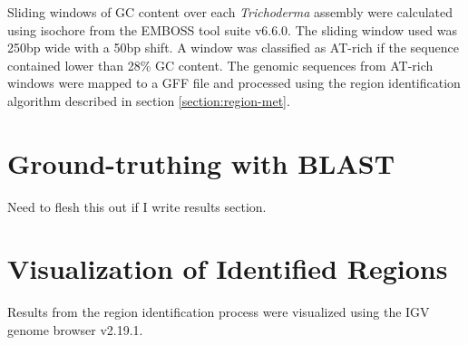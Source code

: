 Sliding windows of GC content over each \textit{Trichoderma} assembly
were calculated using isochore from the EMBOSS tool suite
v6.6.0\cite{Rice2000}. The sliding window used was 250bp wide with a
50bp shift. A window was classified as AT-rich if the sequence
contained lower than 28\% GC content. The genomic sequences from
AT-rich windows were mapped to a GFF file and processed using the
region identification algorithm described in section
\ref{section:region-met}.

\section{Ground-truthing with BLAST}

Need to flesh this out if I write results section.

\section{Visualization of Identified Regions}

Results from the region identification process were visualized using
the IGV genome browser v2.19.1\cite{Robinson2011}.

